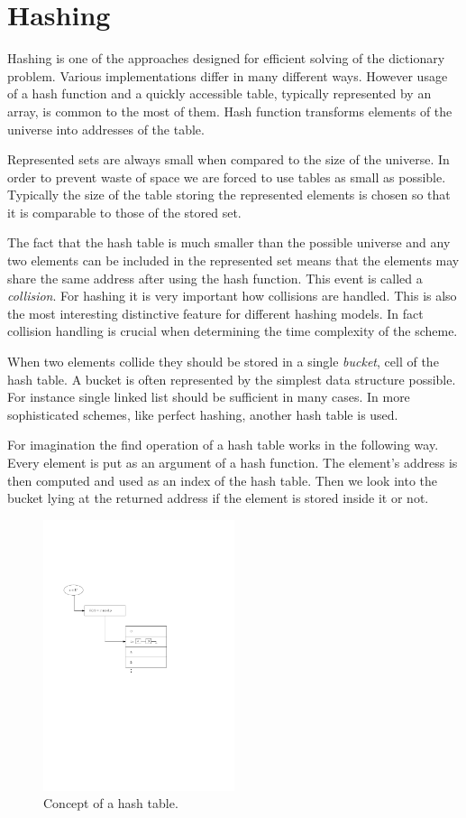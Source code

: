 \chapter{Hashing}
\label{chapter-hashing}
Hashing is one of the approaches designed for efficient solving of the dictionary problem. Various implementations differ in many different ways. However usage of a hash function and a quickly accessible table, typically represented by an array, is common to the most of them. Hash function transforms elements of the universe into addresses of the table.

Represented sets are always small when compared to the size of the universe. In order to prevent waste of space we are forced to use tables as small as possible. Typically the size of the table storing the represented elements is chosen so that it is comparable to those of the stored set. 

The fact that the hash table is much smaller than the possible universe and any two elements can be included in the represented set means that the elements may share the same address after using the hash function. This event is called a \emph{collision}. For hashing it is very important how collisions are handled. This is also the most interesting distinctive feature for different hashing models. In fact collision handling is crucial when determining the time complexity of the scheme.

When two elements collide they should be stored in a single \emph{bucket}, cell of the hash table. A bucket is often represented by the simplest data structure possible. For instance single linked list should be sufficient in many cases. In more sophisticated schemes, like perfect hashing, another hash table is used. 

For imagination the find operation of a hash table works in the following way. Every element is put as an argument of a hash function. The element's address is then computed and used as an index of the hash table. Then we look into the bucket lying at the returned address if the element is stored inside it or not.

\begin{figure}
  \centering
    \includegraphics[width=0.5\textwidth]{images/hash_table}
  \caption{Concept of a hash table.}
\end{figure}


